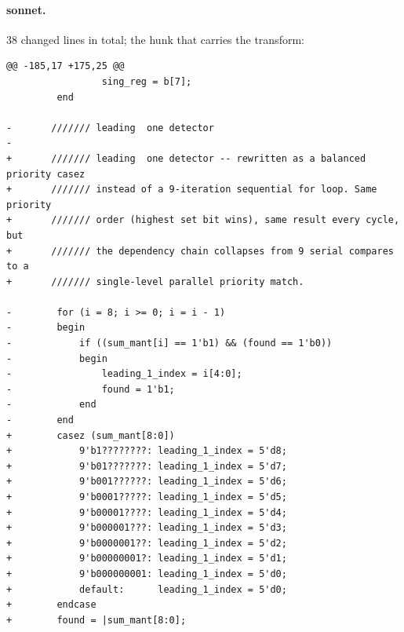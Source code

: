 \paragraph{sonnet.} 38 changed lines in total; the hunk that carries the transform:
\begin{lstlisting}[style=diff]
@@ -185,17 +175,25 @@
                 sing_reg = b[7];
         end
 
-       /////// leading  one detector 
-       
+       /////// leading  one detector -- rewritten as a balanced priority casez
+       /////// instead of a 9-iteration sequential for loop. Same priority
+       /////// order (highest set bit wins), same result every cycle, but
+       /////// the dependency chain collapses from 9 serial compares to a
+       /////// single-level parallel priority match.
 
-        for (i = 8; i >= 0; i = i - 1)
-        begin
-            if ((sum_mant[i] == 1'b1) && (found == 1'b0))
-            begin
-                leading_1_index = i[4:0];
-                found = 1'b1;
-            end
-        end
+        casez (sum_mant[8:0])
+            9'b1????????: leading_1_index = 5'd8;
+            9'b01???????: leading_1_index = 5'd7;
+            9'b001??????: leading_1_index = 5'd6;
+            9'b0001?????: leading_1_index = 5'd5;
+            9'b00001????: leading_1_index = 5'd4;
+            9'b000001???: leading_1_index = 5'd3;
+            9'b0000001??: leading_1_index = 5'd2;
+            9'b00000001?: leading_1_index = 5'd1;
+            9'b000000001: leading_1_index = 5'd0;
+            default:      leading_1_index = 5'd0;
+        endcase
+        found = |sum_mant[8:0];
 
 
\end{lstlisting}
